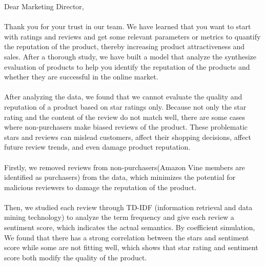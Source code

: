 \documentclass{mcmthesis}
\begin{document}
\memodate{\today}
\begin{memo}[Letter]
Dear Marketing Director,
\\\\
Thank you for your trust in our team. We have learned that you want to start with ratings and reviews and get some relevant parameters or metrics to quantify the reputation of the product, thereby increasing product attractiveness and sales. After a thorough study, we have built a model that analyze the synthesize evaluation of products to help you identify the reputation of the products and whether they are successful in the online market.
\\\\
After analyzing the data, we found that we cannot evaluate the quality and reputation of a product based on star ratings only. Because not only the star rating and the content of the review do not match well, there are some cases where non-purchasers make biased reviews of the product. These problematic stars and reviews can mislead customers, affect their shopping decisions, affect future review trends, and even damage product reputation.
\\\\
Firstly, we removed reviews from non-purchasers(Amazon Vine members are identified as purchasers) from the data, which minimizes the potential for malicious reviewers to damage the reputation of the product. 
\\\\
Then, we studied each review through TD-IDF (information retrieval and data mining technology) to analyze the term frequency and give each review a sentiment score, which indicates the actual semantics. By coefficient simulation, We found that there has a strong correlation between the stars and sentiment score while some are not fitting well, which shows that star rating and sentiment score both modify the quality of the product.
\\\\

\end{memo}
\end{document}
